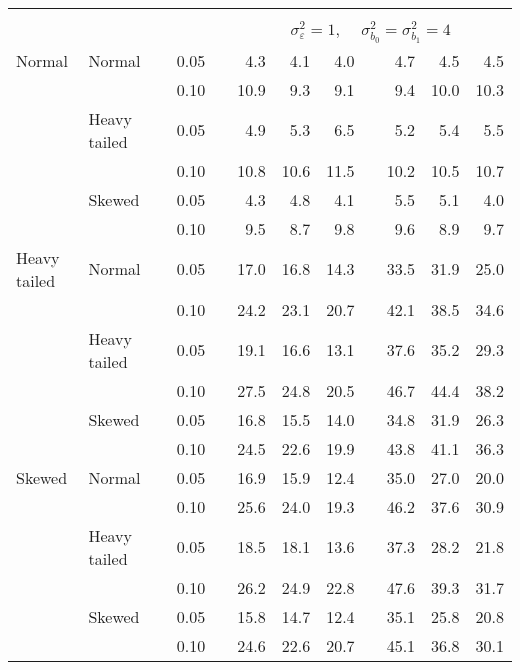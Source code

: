 \begin{table}[ht]
\begin{scriptsize}
\begin{center}
\begin{tabular}{ll p{.1cm} c p{.1cm} rrr p{.1cm} rrr}
&&&&&&&&&&&\\
& && && \multicolumn{7}{c}{$\sigma_{\varepsilon}^2 = 1$, \ \ $\sigma_{b_0}^2 = \sigma_{b_1}^2 = 4$} \\ \cline{6-12}
Normal       & Normal       && 0.05 &&   4.3 & 4.1 & 4.0 &   & 4.7 & 4.5 & 4.5 \\ 
             &              && 0.10 &&   10.9 & 9.3 & 9.1 &   & 9.4 & 10.0 & 10.3 \\ 
             & Heavy tailed && 0.05 &&   4.9 & 5.3 & 6.5 &   & 5.2 & 5.4 & 5.5 \\ 
             &              && 0.10 &&   10.8 & 10.6 & 11.5 &   & 10.2 & 10.5 & 10.7 \\ 
             & Skewed       && 0.05 &&   4.3 & 4.8 & 4.1 &   & 5.5 & 5.1 & 4.0 \\ 
             &              && 0.10 &&   9.5 & 8.7 & 9.8 &   & 9.6 & 8.9 & 9.7 \\ 
Heavy tailed & Normal       && 0.05 &&   17.0 & 16.8 & 14.3 &   & 33.5 & 31.9 & 25.0 \\ 
             &              && 0.10 &&   24.2 & 23.1 & 20.7 &   & 42.1 & 38.5 & 34.6 \\ 
             & Heavy tailed && 0.05 &&   19.1 & 16.6 & 13.1 &   & 37.6 & 35.2 & 29.3 \\ 
             &              && 0.10 &&   27.5 & 24.8 & 20.5 &   & 46.7 & 44.4 & 38.2 \\ 
             & Skewed       && 0.05 &&   16.8 & 15.5 & 14.0 &   & 34.8 & 31.9 & 26.3 \\ 
             &              && 0.10 &&   24.5 & 22.6 & 19.9 &   & 43.8 & 41.1 & 36.3 \\ 
Skewed       & Normal       && 0.05 &&   16.9 & 15.9 & 12.4 &   & 35.0 & 27.0 & 20.0 \\ 
             &              && 0.10 &&   25.6 & 24.0 & 19.3 &   & 46.2 & 37.6 & 30.9 \\ 
             & Heavy tailed && 0.05 &&   18.5 & 18.1 & 13.6 &   & 37.3 & 28.2 & 21.8 \\ 
             &              && 0.10 &&   26.2 & 24.9 & 22.8 &   & 47.6 & 39.3 & 31.7 \\ 
             & Skewed       && 0.05 &&   15.8 & 14.7 & 12.4 &   & 35.1 & 25.8 & 20.8 \\ 
             &              && 0.10 &&   24.6 & 22.6 & 20.7 &   & 45.1 & 36.8 & 30.1 \\ 

\hline
\end{tabular}
\end{center}
\end{scriptsize}
\end{table}


